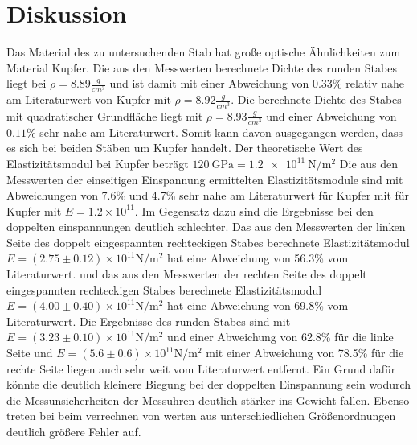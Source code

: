 \section{Diskussion}
\label{sec:Diskussion}
Das Material des zu untersuchenden Stab hat große optische Ähnlichkeiten zum Material Kupfer. Die aus den Messwerten berechnete Dichte des runden Stabes liegt bei $\rho=8.89\frac{g}{cm^3}$ und ist damit mit einer Abweichung von $0.33\%$ relativ nahe am Literaturwert von Kupfer mit $\rho=8.92\frac{g}{cm^3}$.
\noindent Die berechnete Dichte des Stabes mit quadratischer Grundfläche liegt mit $\rho=8.93\frac{g}{cm^3}$ und einer Abweichung von $0.11\%$ sehr nahe am Literaturwert. Somit kann davon ausgegangen werden, dass es sich bei beiden Stäben um Kupfer handelt.
\noindent Der theoretische Wert des Elastizitätsmodul bei Kupfer beträgt $\qty{120}{\giga\pascal}=\qty{1.2e11}{\newton\per\meter\squared}$
Die aus den Messwerten der einseitigen Einspannung ermittelten Elastizitätsmodule sind mit Abweichungen von 7.6\% und 4.7\% sehr nahe am Literaturwert für Kupfer mit  für Kupfer mit $E=1.2\times10^{11}$.
\noindent Im Gegensatz dazu sind die Ergebnisse bei den doppelten einspannungen deutlich schlechter.
\noindent Das aus den Messwerten der linken Seite des doppelt eingespannten rechteckigen Stabes berechnete Elastizitätsmodul $E=(2.75 \pm 0.12) \times 10^{11} \unit{\newton\per\meter\squared}$ hat eine Abweichung von 56.3\% vom Literaturwert.
\noindent und das aus den Messwerten der rechten Seite des doppelt eingespannten rechteckigen Stabes berechnete Elastizitätsmodul $E=(4.00 \pm 0.40) \times 10^{11} \unit{\newton\per\meter\squared}$ hat eine Abweichung von 69.8\% vom Literaturwert.
\noindent Die Ergebnisse des runden Stabes sind mit $E=(3.23 \pm 0.10) \times 10^{11} \unit{\newton\per\meter\squared}$ und einer Abweichung von 62.8\% für die linke Seite und $E=(5.6 \pm 0.6) \times 10^{11} \unit{\newton\per\meter\squared}$ mit einer Abweichung von 78.5\% für die rechte Seite liegen auch sehr weit vom Literaturwert entfernt.
\noindent Ein Grund dafür könnte die deutlich kleinere Biegung bei der doppelten Einspannung sein wodurch die Messunsicherheiten der Messuhren deutlich stärker ins Gewicht fallen.
\noindent Ebenso treten bei beim verrechnen von werten aus unterschiedlichen Größenordnungen deutlich größere Fehler auf.